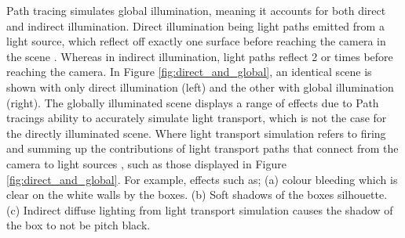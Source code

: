 \documentclass[ %
                    author={Callum Pearce},
                supervisor={Dr. Neill Campbell},
                    degree={MEng},
                     title={How effective are Temporal difference learning methods for reducing the number of zero contribution light paths, while still accurately approximating Global Illumination in Path tracing?},
                  subtitle={},
                      type={research},
                      year={2019} ]{dissertation}
\begin{document}
Path tracing simulates global illumination, meaning it accounts for both direct and 
indirect illumination. Direct illumination being light paths emitted from a light 
source, which reflect off exactly one surface before reaching the camera in the 
scene . Whereas in indirect illumination, light paths reflect 2 or times before
reaching the camera. In Figure \ref{fig:direct_and_global}, an identical scene is shown with only direct illumination
(left) and the other with global illumination (right). The globally illuminated scene displays
a range of effects due to Path tracings ability to accurately simulate light transport, 
which is not the case for the directly illuminated scene. Where light transport simulation
refers to firing and summing up the contributions of light transport paths that connect from the
camera to light sources \cite{keller2016path}, such as those displayed in Figure \ref{fig:direct_and_global}. For 
example, effects such as; (a) colour bleeding which is clear on the white walls by the boxes. (b) Soft shadows of the boxes silhouette. (c) Indirect diffuse lighting
from light transport simulation causes the shadow of the box to not be pitch black.\\
\end{document}
